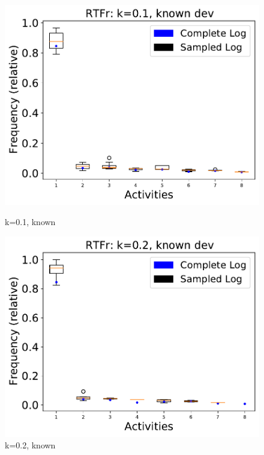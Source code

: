 \documentclass[landscape]{article}
\begin{document}
\begin{figure}[!htb]
	\centering
	\begin{minipage}{0.2\textwidth}
		\includegraphics[width=1.0\textwidth]{../RTFM_model2/RTFM_model2_deviationsApprox_0.1_NONALIGNING_KNOWN.pdf}
		\caption{k=0.1, known}
	\end{minipage}
	\hfill
	\begin{minipage}{0.2\textwidth}
		\includegraphics[width=1.0\textwidth]{../RTFM_model2/RTFM_model2_deviationsApprox_0.2_NONALIGNING_KNOWN.pdf}
		\caption{k=0.2, known}
	\end{minipage}
	\hfill
	\begin{minipage}{0.2\textwidth}

\end{minipage}
\end{figure}
\end{document}
